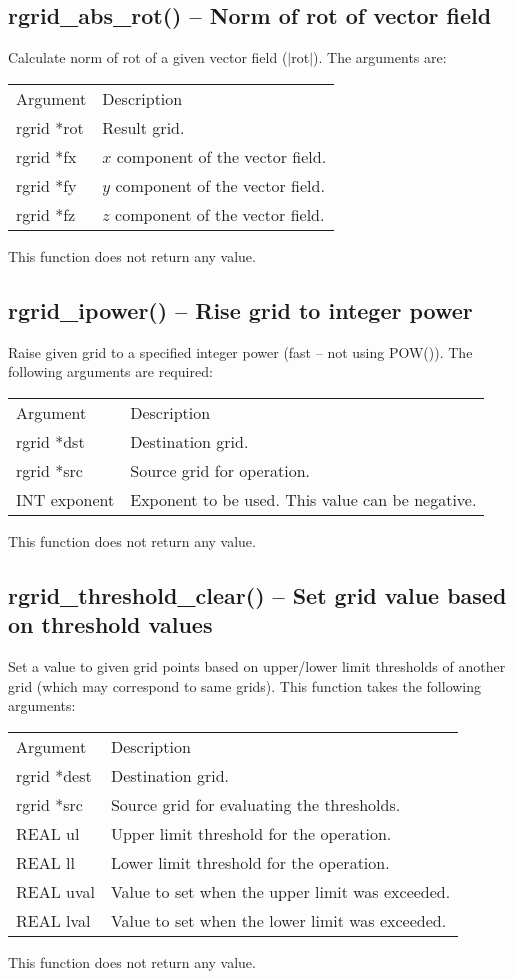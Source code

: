 \documentclass[12pt,letterpaper]{report}
\begin{document}
\subsection{rgrid\_abs\_rot() -- Norm of rot of vector field}

Calculate norm of rot of a given vector field ($|$rot$|$). The arguments are:
\begin{longtable}{p{} p{}}
Argument & Description\\
\cline{1-2}
rgrid *rot & Result grid.\\
rgrid *fx  & $x$ component of the vector field.\\
rgrid *fy  & $y$ component of the vector field.\\
rgrid *fz  & $z$ component of the vector field.\\
\end{longtable}
\noindent
This function does not return any value. 

\subsection{rgrid\_ipower() -- Rise grid to integer power}

Raise given grid to a specified integer power (fast -- not using POW()). The following arguments are required:
\begin{longtable}{p{} p{}}
Argument & Description\\
\cline{1-2}
rgrid *dst & Destination grid.\\
rgrid *src & Source grid for operation.\\
INT exponent & Exponent to be used. This value can be negative.\\
\end{longtable}
\noindent
This function does not return any value. 

\subsection{rgrid\_threshold\_clear() -- Set grid value based on threshold values}

Set a value to given grid points based on upper/lower limit thresholds of another grid (which may correspond to same grids). This function takes the following arguments:
\begin{longtable}{p{} p{}}
Argument & Description\\
\cline{1-2}
rgrid *dest & Destination grid.\\
rgrid *src  & Source grid for evaluating the thresholds.\\
REAL ul & Upper limit threshold for the operation.\\
REAL ll & Lower limit threshold for the operation.\\
REAL uval & Value to set when the upper limit was exceeded.\\
REAL lval & Value to set when the lower limit was exceeded.\\
\end{longtable}
\noindent
This function does not return any value. 
\end{document}

